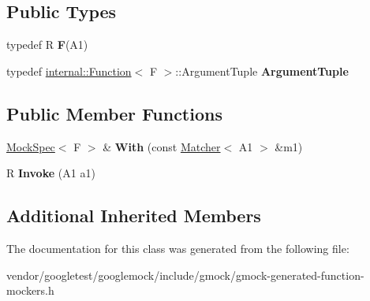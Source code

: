 \subsection*{Public Types}
\begin{DoxyCompactItemize}
\item 
typedef R {\bfseries F}(A1)\hypertarget{classtesting_1_1internal_1_1FunctionMocker_3_01R_07A1_08_4_ada54286442ab14a18c2308cef748848f}{}\label{classtesting_1_1internal_1_1FunctionMocker_3_01R_07A1_08_4_ada54286442ab14a18c2308cef748848f}

\item 
typedef \hyperlink{structtesting_1_1internal_1_1Function}{internal\+::\+Function}$<$ F $>$\+::Argument\+Tuple {\bfseries Argument\+Tuple}\hypertarget{classtesting_1_1internal_1_1FunctionMocker_3_01R_07A1_08_4_aacec6412ac4343c071d7dfe965558b0b}{}\label{classtesting_1_1internal_1_1FunctionMocker_3_01R_07A1_08_4_aacec6412ac4343c071d7dfe965558b0b}

\end{DoxyCompactItemize}
\subsection*{Public Member Functions}
\begin{DoxyCompactItemize}
\item 
\hyperlink{classtesting_1_1internal_1_1MockSpec}{Mock\+Spec}$<$ F $>$ \& {\bfseries With} (const \hyperlink{classtesting_1_1Matcher}{Matcher}$<$ A1 $>$ \&m1)\hypertarget{classtesting_1_1internal_1_1FunctionMocker_3_01R_07A1_08_4_aa61b5c24c52b8c49713774c49a01b26e}{}\label{classtesting_1_1internal_1_1FunctionMocker_3_01R_07A1_08_4_aa61b5c24c52b8c49713774c49a01b26e}

\item 
R {\bfseries Invoke} (A1 a1)\hypertarget{classtesting_1_1internal_1_1FunctionMocker_3_01R_07A1_08_4_a4a58d37902572c8136d999c5008dce1a}{}\label{classtesting_1_1internal_1_1FunctionMocker_3_01R_07A1_08_4_a4a58d37902572c8136d999c5008dce1a}

\end{DoxyCompactItemize}
\subsection*{Additional Inherited Members}


The documentation for this class was generated from the following file\+:\begin{DoxyCompactItemize}
\item 
vendor/googletest/googlemock/include/gmock/gmock-\/generated-\/function-\/mockers.\+h\end{DoxyCompactItemize}
